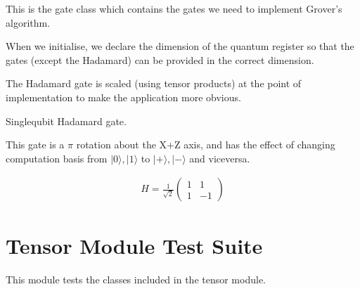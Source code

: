 \documentclass[letterpaper,10pt,english]{sphinxmanual}
\begin{document}
\begin{fulllineitems}
\label{\detokenize{index:gates.Gate}}
\pysigstartsignatures
{}
\pysigstopsignatures
\sphinxAtStartPar
This is the gate class which contains the gates we need to implement
Grover’s algorithm.

\sphinxAtStartPar
When we initialise, we declare the dimension of the quantum
register so that the gates (except the Hadamard) can be provided in
the correct dimension.

\sphinxAtStartPar
The Hadamard gate is scaled (using tensor products) at the point
of implementation to make the application more obvious.

\begin{fulllineitems}
\label{\detokenize{index:gates.Gate.h}}
\pysigstartsignatures
{}
\pysigstopsignatures
\sphinxAtStartPar
Single\sphinxhyphen{}qubit Hadamard gate.

\sphinxAtStartPar
This gate is a \(\pi\) rotation about the X+Z axis, and has the effect
of changing computation basis from \(|0\rangle,|1\rangle\) to
\(|+\rangle,|-\rangle\) and vice\sphinxhyphen{}versa.

\sphinxAtStartPar
{}
\begin{equation*}
\begin{split}H = \frac{1}{\sqrt{2}}
    \begin{pmatrix}
        1 & 1 \\
        1 & -1
    \end{pmatrix}\end{split}
\end{equation*}
\end{fulllineitems}


\end{fulllineitems}


\chapter{Tensor Module Test Suite}
\label{\detokenize{index:tensor-module-test-suite}}\label{\detokenize{index:module-tests.test_tensor}}
\sphinxAtStartPar
This module tests the classes included in the tensor module.
\end{document}
